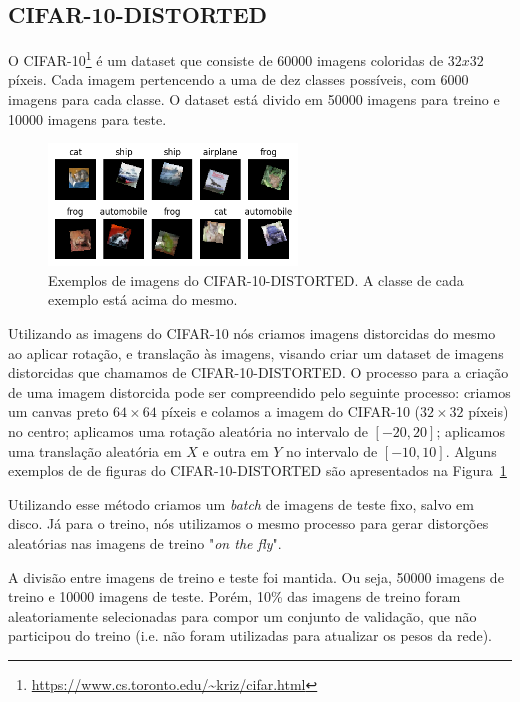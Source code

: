 \documentclass[conference]{IEEEtran}
\begin{document}
\subsection{CIFAR-10-DISTORTED}

O CIFAR-10\footnote{\url{https://www.cs.toronto.edu/~kriz/cifar.html}} é um dataset que consiste de 60000 imagens coloridas de $32x32$ píxeis. Cada imagem pertencendo a uma de dez classes possíveis, com 6000 imagens para cada classe. O dataset está divido em 50000 imagens para treino e 10000 imagens para teste.

\begin{figure}[ht!]
  \centering
  \includegraphics[width=250px]{img/C10D-samples.png}
  \caption{Exemplos de imagens do CIFAR-10-DISTORTED. A classe de cada exemplo está acima do mesmo.}
  \label{fig:c10d-samples}
\end{figure}

Utilizando as imagens do CIFAR-10 nós criamos imagens distorcidas do mesmo ao aplicar rotação, e translação às imagens, visando criar um dataset de imagens distorcidas que chamamos de CIFAR-10-DISTORTED. O processo para a criação de uma imagem distorcida pode ser compreendido pelo seguinte processo: criamos um canvas preto $64\times64$ píxeis e colamos a imagem do CIFAR-10 ($32\times32$ píxeis) no centro; aplicamos uma rotação aleatória no intervalo de $[-20, 20]$; aplicamos uma translação aleatória em $X$ e outra em $Y$ no intervalo de $[-10, 10]$. Alguns exemplos de de figuras do CIFAR-10-DISTORTED são apresentados na Figura~\ref{fig:c10d-samples}

Utilizando esse método criamos um \textit{batch} de imagens de teste fixo, salvo em disco. Já para o treino, nós utilizamos o mesmo processo para gerar distorções aleatórias nas imagens de treino "\textit{on the fly}".

A divisão entre imagens de treino e teste foi mantida. Ou seja, 50000 imagens de treino e 10000 imagens de teste. Porém, 10\% das imagens de treino foram aleatoriamente selecionadas para compor um conjunto de validação, que não participou do treino (i.e. não foram utilizadas para atualizar os pesos da rede).
\end{document}
